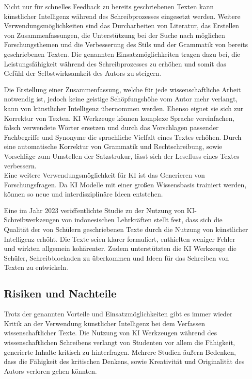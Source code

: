 \documentclass[../main.tex]{subfiles}
\begin{document}
Nicht nur für schnelles Feedback zu bereits geschriebenen Texten kann künstlicher Intelligenz während des Schreibprozesses eingesetzt werden. 
Weitere Verwendungsmöglichkeiten sind das Durcharbeiten von Literatur, das Erstellen von Zusammenfassungen, die Unterstützung bei der Suche nach 
möglichen Forschungsthemen und die Verbesserung des Stils und der Grammatik von bereits geschriebenen Texten. Die genannten Einsatzmöglichkeiten 
tragen dazu bei, die Leistungsfähigkeit während des Schreibprozesses zu erhöhen und somit das Gefühl der Selbstwirksamkeit des Autors zu steigern.\cite{SelfEfficacyBeliefs}

Die Erstellung einer Zusammenfassung, welche für jede wissenschaftliche Arbeit notwendig ist, jedoch keine geistige Schöpfungshöhe vom Autor mehr verlangt, 
kann von künstlicher Intelligenz übernommen werden. Ebenso eignet sie sich zur Korrektur von Texten. KI Werkzeuge können komplexe Sprache vereinfachen, falsch 
verwendete Wörter ersetzen und durch das Vorschlagen passender Fachbegriffe und Synonyme die sprachliche Vielfalt eines Textes erhöhen. Durch eine 
automatische Korrektur von Grammatik und Rechtschreibung, sowie Vorschläge zum Umstellen der Satzstrukur, lässt sich der Lesefluss eines Textes verbessern.\cite{ZukunftWissenschaftlichesPublizieren,teachers}\\
Eine weitere Verwendungsmöglichkeit für KI ist das Generieren von Forschungsfragen. Da KI Modelle mit einer großen Wissensbasis trainiert werden, 
können so neue und interdisziplinäre Ideen entstehen.\cite{ZukunftWissenschaftlichesPublizieren,humanWritingToAi}

Eine im Jahr 2023 veröffentlichte Studie zu der Nutzung von KI-Schreibwerkzeugen von indonesischen Lehrkräften stellt fest, dass sich die Qualität der von 
Schülern geschriebenen Texte durch die Nutzung von künstlicher Intelligenz erhöht. Die Texte seien klarer formuliert, enthielten weniger Fehler und 
wirkten allgemein kohärenter. Zudem unterstützten die KI Werkzeuge die Schüler, Schreibblockaden zu überkommen und Ideen für das Schreiben von Texten zu entwickeln.\cite{teachers} 

\subsection{Risiken und Nachteile}

Trotz der genannten Vorteile und Einsatzmöglichkeiten gibt es immer wieder Kritik an der Verwendung künstlicher Intelligenz bei dem Verfassen wissenschaftlicher Texte. 
Die Nutzung von KI Werkzeugen während des wissenschaftlichen Schreibens verlangt von Studenten vor allem die Fähigkeit, generierte Inhalte kritisch zu 
hinterfragen. Mehrere Studien äußern Bedenken, dass die Fähigkeit des kritischen Denkens, sowie Kreativität und Originalität des Autors verloren gehen könnten.\cite{ZukunftWissenschaftlichesPublizieren,teachers,BucherSchwarzerHolzwweißig}
\end{document}
